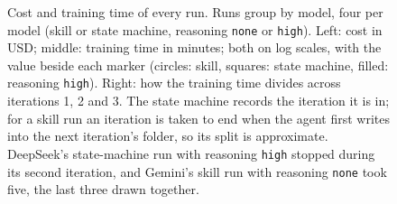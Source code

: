 \begin{table}[tbp]\centering\small
\caption{Training time per run in minutes: model time plus code time up to the end of the last iteration (\cref{sec:accounting}). Each model's fastest run is marked in
bold; the fastest overall is marked bold and underlined.}
\label{tab:time}
\TimeTable
\end{table}

\begin{figure}[tbp]\centering

\caption{Cost and training time of every run. Runs group by model, four per model (skill or state machine, reasoning
\texttt{none} or \texttt{high}). Left: cost in USD; middle: training time in minutes; both on log scales, with the
value beside each marker (circles: skill, squares: state machine, filled: reasoning \texttt{high}). Right: how the
training time divides across iterations 1, 2 and 3. The state machine records the iteration it is in; for a skill run
an iteration is taken to end when the agent first writes into the next iteration's folder, so its split is
approximate. DeepSeek's state-machine run with reasoning \texttt{high} stopped during its second iteration, and Gemini's skill run with
reasoning \texttt{none} took five, the last three drawn together.}
\label{fig:time}
\end{figure}
